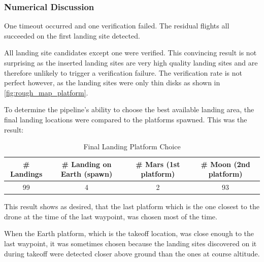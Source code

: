         \subsubsection{Numerical Discussion}
        One timeout occurred and one verification failed. The residual flights all succeeded on the first landing site detected.

        
        All landing site candidates except one were verified. This convincing result is not surprising as the inserted landing sites are very high quality landing sites and are therefore unlikely to trigger a verification failure. The verification rate is not perfect however, as the landing sites were only thin disks as shown in \cref{fig:rough_map_platform}. 

        To determine the pipeline's ability to choose the best available landing area, the final landing locations were compared to the platforms spawned. This was the result:

        \begin{table}[h]
            \begin{center}
             \caption{Final Landing Platform Choice}\vspace{1ex}
             \label{tab:final_landing_platform}
             \begin{tabular}{|c|c|c|c|}
             \hline
             \# Landings & \# Landing on Earth (spawn) & \# Mars (1st platform) & \# Moon (2nd platform)\\ \hline \hline
             99 & 4 & 2 & 93 \\
             \hline
             \end{tabular}
            \end{center}
        \end{table}

        This result shows as desired, that the last platform which is the one closest to the drone at the time of the last waypoint, was chosen most of the time. 
        
        When the Earth platform, which is the takeoff location, was close enough to the last waypoint, it was sometimes chosen because the landing sites discovered on it during takeoff were detected closer above ground than the ones at course altitude.

